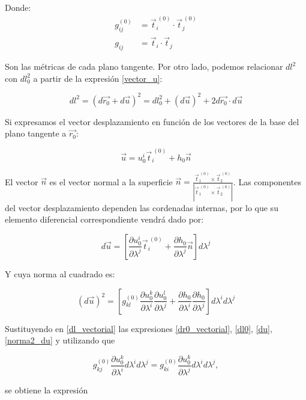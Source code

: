 Donde:
\begin{align*}
g^{(0)}_{ij}&=\vec{t}^{\ (0)}_i\cdot\vec{t}^{\ (0)}_j\\
g_{ij}&=\vec{t}_i\cdot\vec{t}_j
\end{align*}

Son las métricas de cada plano tangente. Por otro lado, podemos relacionar
$dl^2$ con $dl^2_0$ a partir de la expresión 
\eqref{vector_u}:

\begin{equation}\label{dl_vectorial}
dl^2=(d\vec{r_0}+d\vec{u})^2=dl^2_0+(d\vec{u})^2+2d\vec{r_0}\cdot d\vec{u}
\end{equation}


Si expresamos el vector desplazamiento en función de los vectores de la
base del plano tangente a $\vec{r_0}$:

\begin{equation*}
\vec{u}=u^i_0\vec{t}^{\ (0)}_i+h_0\vec{n}
\end{equation*}

El vector $\vec{n}$ es el vector normal a la superficie
$\vec{n}=\frac{\vec{t}^{\ (0)}_1\times \vec{t}_2^{\ (0)}}{|\vec{t}^{\
    (0)}_1\times \vec{t}_2^{\ (0)}|}$. Las componentes del vector
desplazamiento dependen las cordenadas internas, por lo que su elemento
diferencial correspondiente vendrá dado por: 

\begin{equation}\label{du}
d\vec{u}=\left[\frac{\partial
  u_0^i}{\partial\lambda^j}\vec{t}^{\ (0)}_i+\frac{\partial h_0}{\partial \lambda^j} \vec{n}\right]d\lambda^j
\end{equation}

Y cuya norma al cuadrado es:

\begin{equation}\label{norma2_du}
(d\vec{u})^2=\left[g^{(0)}_{kl}
\frac{\partial u_0^k}{\partial\lambda^i}
\frac{\partial u_0^l}{\partial\lambda^j}+ 
\frac{\partial h_0}{\partial \lambda^i}
\frac{\partial h_0}{\partial \lambda^j}\right]
d\lambda^id\lambda^j 
\end{equation}

Sustituyendo en \eqref{dl_vectorial} las expresiones \eqref{dr0_vectorial}, \eqref{dl0}, \eqref{du},
\eqref{norma2_du} y utilizando que

 $$g^{(0)}_{kj}\frac{\partial u^k_0}{\partial
   \lambda^i}d\lambda^id\lambda^j=g^{(0)}_{ki}\frac{\partial u^k_0}{\partial
   \lambda^j}d\lambda^id\lambda^j,$$

se obtiene la expresión

